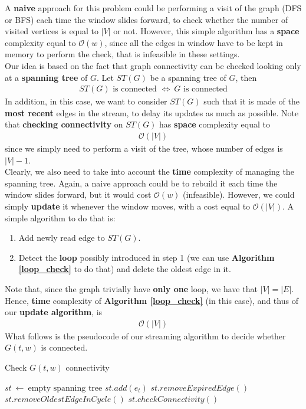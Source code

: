 A \textbf{naive} approach for this problem could be performing a visit of the graph (DFS or BFS) each time the window slides forward, to check whether the number of visited vertices is equal to $|V|$ or not. However, this simple algorithm has a \textbf{space} complexity equal to $\mathcal{O}(w)$, since all the edges in window have to be kept in memory to perform the check, that is infeasible in these settings.\\
Our idea is based on the fact that graph connectivity can be checked looking only at a \textbf{spanning tree} of $G$. Let $ST(G)$ be a spanning tree of $G$, then
\begin{align*}
ST(G)\text{ is connected }\Leftrightarrow \ G\text{ is connected}
\end{align*}
In addition, in this case, we want to consider $ST(G)$ such that it is made of the \textbf{most recent} edges in the stream, to delay its updates as much as possible. Note that \textbf{checking connectivity} on $ST(G)$ has \textbf{space} complexity equal to 
\begin{align*}
\mathcal{O}(|V|)
\end{align*}
since we simply need to perform a visit of the tree, whose number of edges is $|V| - 1$.\\
Clearly, we also need to take into account the \textbf{time} complexity of managing the spanning tree. Again, a naive approach could be to rebuild it each time the window slides forward, but it would cost $\mathcal{O}(w)$ (infeasible). However, we could simply \textbf{update} it whenever the window moves, with a cost equal to $\mathcal{O}(|V|)$. A simple algorithm to do that is:
\begin{enumerate}
	\item Add newly read edge to $ST(G)$.
	\item Detect the \textbf{loop} possibly introduced in step 1 (we can use \textbf{Algorithm \ref{loop_check}} to do that) and delete the oldest edge in it.
\end{enumerate}
Note that, since the graph trivially have \textbf{only one} loop, we have that $|V| = |E|$. Hence, \textbf{time} complexity of \textbf{Algorithm \ref{loop_check}} (in this case), and thus of our \textbf{update algorithm}, is
\begin{align*}
\mathcal{O}(|V|)
\end{align*}
What follows is the pseudocode of our streaming algorithm to decide whether $G(t,w)$ is connected.

\newpage
\begin{algorithm}
	\caption{Check $G(t,w)$ connectivity}
	\begin{algorithmic}[1]
		\State $st \ \leftarrow \ \text{empty spanning tree}$
			\State $st.add(e_t)$
			\State $st.removeExpiredEdge()$
			\State $st.removeOldestEdgeInCycle()$
			\State \Return $st.checkConnectivity()$
		\EndEvent
	\end{algorithmic}
\end{algorithm}
